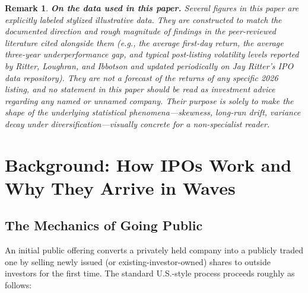 \documentclass[conference]{IEEEtran}
\newtheorem{remark}{Remark}
\begin{document}
\begin{remark}
\textbf{On the data used in this paper.} Several figures in this paper are explicitly labeled \emph{stylized illustrative data}. They are constructed to match the documented \emph{direction and rough magnitude} of findings in the peer-reviewed literature cited alongside them (e.g., the average first-day return, the average three-year underperformance gap, and typical post-listing volatility levels reported by Ritter, Loughran, and Ibbotson and updated periodically on Jay Ritter's IPO data repository). They are \emph{not} a forecast of the returns of any specific 2026 listing, and no statement in this paper should be read as investment advice regarding any named or unnamed company. Their purpose is solely to make the shape of the underlying statistical phenomena---skewness, long-run drift, variance decay under diversification---visually concrete for a non-specialist reader.
\end{remark}

\section{Background: How IPOs Work and Why They Arrive in Waves}
\label{sec:background}

\subsection{The Mechanics of Going Public}

An initial public offering converts a privately held company into a publicly traded one by selling newly issued (or existing-investor-owned) shares to outside investors for the first time. The standard U.S.-style process proceeds roughly as follows:
\end{document}
